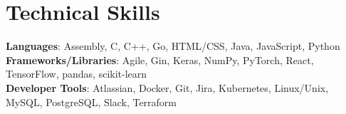 \documentclass[letterpaper,11pt]{article}
\begin{document}
\section{Technical Skills}

  \begin{itemize}[leftmargin=0.15in, label={}]
    \small{\item{
      \textbf{Languages}{: Assembly, C, C++, Go, HTML/CSS, Java, JavaScript, Python} \\
      \textbf{Frameworks/Libraries}{: Agile, Gin, Keras, NumPy, PyTorch, React, TensorFlow, pandas, scikit-learn} \\
      \textbf{Developer Tools}{: Atlassian, Docker, Git, Jira, Kubernetes, Linux/Unix, MySQL, PostgreSQL, Slack, Terraform}}}
  \end{itemize}
\end{document}
